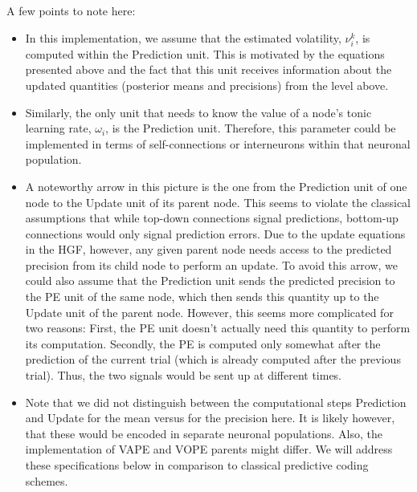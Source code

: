 A few points to note here:
\begin{itemize}
\item In this implementation, we assume that the estimated volatility, $\nu_i^{k}$, is computed within the \textsf{Prediction} unit. This is motivated by the equations presented above and the fact that this unit receives information about the updated quantities (posterior means and precisions) from the level above.
\item Similarly, the only unit that needs to know the value of a node's tonic learning rate, $\omega_i$, is the \textsf{Prediction} unit. Therefore, this parameter could be implemented in terms of self-connections or interneurons within that neuronal population.
\item A noteworthy arrow in this picture is the one from the \textsf{Prediction} unit of one node to the \textsf{Update} unit of its parent node. This seems to violate the classical assumptions that while top-down connections signal predictions, bottom-up connections would only signal prediction errors. Due to the update equations in the HGF, however, any given parent node needs access to the predicted precision from its child node to perform an update. To avoid this arrow, we could also assume that the \textsf{Prediction} unit sends the predicted precision to the \textsf{PE} unit of the same node, which then sends this quantity up to the \textsf{Update} unit of the parent node. However, this seems more complicated for two reasons: First, the \textsf{PE} unit doesn't actually need this quantity to perform its computation. Secondly, the PE is computed only somewhat after the prediction of the current trial (which is already computed after the previous trial). Thus, the two signals would be sent up at different times.
\item Note that we did not distinguish between the computational steps \textsf{Prediction} and \textsf{Update} for the mean versus for the precision here. It is likely however, that these would be encoded in separate neuronal populations. Also, the implementation of VAPE and VOPE parents might differ. We will address these specifications below in comparison to classical predictive coding schemes.
\end{itemize}
